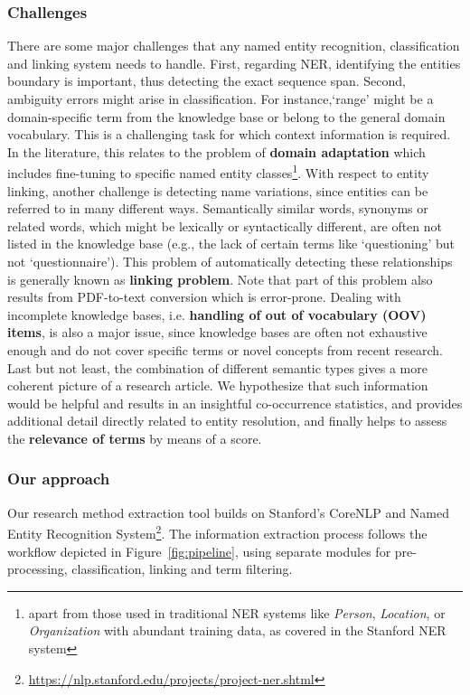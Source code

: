 \subsubsection{Challenges}
There are some major challenges that any named entity recognition, classification and linking system needs to handle.
First, regarding NER, identifying the entities boundary is important, thus detecting the exact sequence span. 
Second, ambiguity errors might arise in classification. For instance,`range' might be a domain-specific term from the knowledge base or belong to the general domain vocabulary. This is a challenging task for which context information is required. 
In the literature, this relates to the problem of \textbf{domain adaptation} which includes fine-tuning to specific named entity classes\footnote{apart from those used in traditional NER systems like \textit{Person}, \textit{Location}, or \textit{Organization} with abundant training data, as covered in the Stanford NER system\cite{finkel2005incorporating}}.
With respect to entity linking, another challenge is detecting name variations, since entities can be referred to in many different ways.
Semantically similar words, synonyms or related words, which might be lexically or syntactically different, are often not listed in the knowledge base 
(e.g., the lack of certain terms like `questioning' but not `questionnaire'). This problem of automatically detecting these relationships is generally known as \textbf{linking problem}. 
Note that part of this problem also results from PDF-to-text conversion which is error-prone. 
Dealing with incomplete knowledge bases, i.e. \textbf{handling of out of vocabulary (OOV) items}, is also a major issue, since 
knowledge bases are often not exhaustive enough and do not cover specific terms or novel concepts from recent research.
Last but not least, the combination of different semantic types gives a more coherent picture of a research article. We hypothesize that such information would be helpful and results in an insightful co-occurrence statistics, and provides additional detail directly related to entity resolution, and finally helps to assess the \textbf{relevance of terms} by means of a score.

 
\subsubsection{Our approach} 
Our research method extraction tool builds on Stanford’s CoreNLP and Named Entity Recognition System\footnote{\url{https://nlp.stanford.edu/projects/project-ner.shtml}}. 
The information extraction process follows the workflow depicted in Figure~\ref{fig:pipeline}, using separate modules for pre-processing, classification, linking and term filtering.

